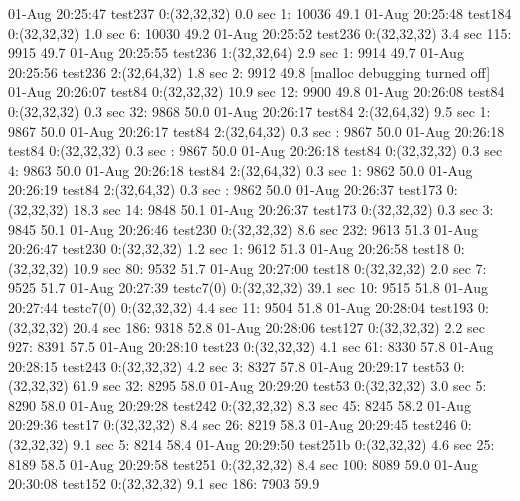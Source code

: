 01-Aug 20:25:47 test237     0:(32,32,32)     0.0 sec    1: 10036 49.1%
01-Aug 20:25:48 test184     0:(32,32,32)     1.0 sec    6: 10030 49.2%
01-Aug 20:25:52 test236     0:(32,32,32)     3.4 sec  115:  9915 49.7%
01-Aug 20:25:55 test236     1:(32,32,64)     2.9 sec    1:  9914 49.7%
01-Aug 20:25:56 test236     2:(32,64,32)     1.8 sec    2:  9912 49.8%
[malloc debugging turned off]
01-Aug 20:26:07 test84      0:(32,32,32)    10.9 sec   12:  9900 49.8%
01-Aug 20:26:08 test84      0:(32,32,32)     0.3 sec   32:  9868 50.0%
01-Aug 20:26:17 test84      2:(32,64,32)     9.5 sec    1:  9867 50.0%
01-Aug 20:26:17 test84      2:(32,64,32)     0.3 sec     :  9867 50.0%
01-Aug 20:26:18 test84      0:(32,32,32)     0.3 sec     :  9867 50.0%
01-Aug 20:26:18 test84      0:(32,32,32)     0.3 sec    4:  9863 50.0%
01-Aug 20:26:18 test84      2:(32,64,32)     0.3 sec    1:  9862 50.0%
01-Aug 20:26:19 test84      2:(32,64,32)     0.3 sec     :  9862 50.0%
01-Aug 20:26:37 test173     0:(32,32,32)    18.3 sec   14:  9848 50.1%
01-Aug 20:26:37 test173     0:(32,32,32)     0.3 sec    3:  9845 50.1%
01-Aug 20:26:46 test230     0:(32,32,32)     8.6 sec  232:  9613 51.3%
01-Aug 20:26:47 test230     0:(32,32,32)     1.2 sec    1:  9612 51.3%
01-Aug 20:26:58 test18      0:(32,32,32)    10.9 sec   80:  9532 51.7%
01-Aug 20:27:00 test18      0:(32,32,32)     2.0 sec    7:  9525 51.7%
01-Aug 20:27:39 testc7(0)   0:(32,32,32)    39.1 sec   10:  9515 51.8%
01-Aug 20:27:44 testc7(0)   0:(32,32,32)     4.4 sec   11:  9504 51.8%
01-Aug 20:28:04 test193     0:(32,32,32)    20.4 sec  186:  9318 52.8%
01-Aug 20:28:06 test127     0:(32,32,32)     2.2 sec  927:  8391 57.5%
01-Aug 20:28:10 test23      0:(32,32,32)     4.1 sec   61:  8330 57.8%
01-Aug 20:28:15 test243     0:(32,32,32)     4.2 sec    3:  8327 57.8%
01-Aug 20:29:17 test53      0:(32,32,32)    61.9 sec   32:  8295 58.0%
01-Aug 20:29:20 test53      0:(32,32,32)     3.0 sec    5:  8290 58.0%
01-Aug 20:29:28 test242     0:(32,32,32)     8.3 sec   45:  8245 58.2%
01-Aug 20:29:36 test17      0:(32,32,32)     8.4 sec   26:  8219 58.3%
01-Aug 20:29:45 test246     0:(32,32,32)     9.1 sec    5:  8214 58.4%
01-Aug 20:29:50 test251b    0:(32,32,32)     4.6 sec   25:  8189 58.5%
01-Aug 20:29:58 test251     0:(32,32,32)     8.4 sec  100:  8089 59.0%
01-Aug 20:30:08 test152     0:(32,32,32)     9.1 sec  186:  7903 59.9%

